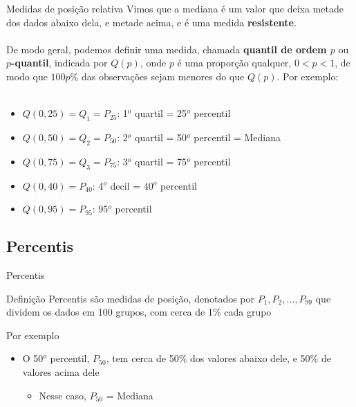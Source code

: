 \documentclass[10pt]{beamer}\usepackage[]{graphicx}\usepackage[]{color}
\theoremstyle{definition}
\begin{document}
\begin{frame}{Medidas de posição relativa}
  Vimos que a mediana é um valor que deixa metade dos dados abaixo dela,
  e metade acima, e é uma medida \textbf{resistente}. \\~\\
  De modo geral, podemos definir uma medida, chamada \textbf{quantil de
    ordem $p$} ou \textbf{$p$-quantil}, indicada por $Q(p)$, onde $p$ é uma
  proporção qualquer, $0 < p <1$, de modo que $100p\%$ das observações
  sejam menores do que $Q(p)$. Por exemplo: \\~\\
  \begin{itemize}
  \item $Q(0,25) = Q_1 = P_{25}$: 1$^o$ quartil = 25$^o$ percentil
  \item $Q(0,50) = Q_2 = P_{50}$: 2$^o$ quartil = 50$^o$ percentil = Mediana
  \item $Q(0,75) = Q_3 = P_{75}$: 3$^o$ quartil = 75$^o$ percentil
  \item $Q(0,40) = P_{40}$: 4$^o$ decil = 40$^o$ percentil
  \item $Q(0,95) = P_{95}$: 95$^o$ percentil
  \end{itemize}
\end{frame}

\subsection{Percentis}

\begin{frame}{Percentis}
  \begin{block}{Definição}
    Percentis são medidas de posição, denotados por $P_1, P_2,
    \ldots, P_{99}$ que dividem os dados em 100 grupos, com cerca de 1\%
    cada grupo
  \end{block}
  Por exemplo
  \begin{itemize}
  \item O 50$^o$ percentil, $P_{50}$, tem cerca de 50\% dos valores
    abaixo dele, e 50\% de valores acima dele
    \begin{itemize}
    \item Nesse caso, $P_{50}$ = Mediana
    \end{itemize}
  \end{itemize}
\end{frame}
\end{document}
